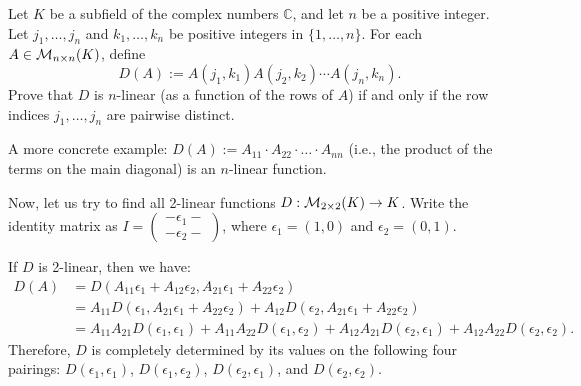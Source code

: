 \begin{exercise}
\label{exc:monomial_matrix_multilinear}
Let $K$ be a subfield of the complex numbers $\mathbb{C}$, and let $n$ be a positive integer. Let $j_1, \dots, j_n$ and $k_1, \dots, k_n$ be positive integers in $\{1, \dots, n\}$. For each $A \in \mathcal{M}_{n \times n}(K)$, define
\[
D(A) := A(j_1, k_1) A(j_2, k_2) \cdots A(j_n, k_n).
\]
Prove that $D$ is $n$-linear (as a function of the rows of $A$) if and only if the row indices $j_1, \dots, j_n$ are pairwise distinct.
\end{exercise}

\begin{example}\label{ex:diagonal_product}
  A more concrete example: $D(A) := A_{11} \cdot A_{22} \cdot \dots \cdot A_{nn}$ (i.e., the product of the terms on the main diagonal) is an $n$-linear function.
\end{example}

Now, let us try to find all 2-linear functions $D: \mathcal{M}_{2 \times 2}(K) \to K$. Write the identity matrix as $I = \left(\begin{smallmatrix} -\epsilon_1- \\ -\epsilon_2- \end{smallmatrix}\right)$, where $\epsilon_1 = (1, 0)$ and $\epsilon_2 = (0, 1)$.

If $D$ is 2-linear, then we have:
\begin{align*}
  D(A) &= D(A_{11}\epsilon_1 + A_{12}\epsilon_2, A_{21}\epsilon_1 + A_{22}\epsilon_2) \\
  &= A_{11} D(\epsilon_1, A_{21}\epsilon_1 + A_{22}\epsilon_2) + A_{12} D(\epsilon_2, A_{21}\epsilon_1 + A_{22}\epsilon_2) \\
  &= A_{11}A_{21}D(\epsilon_1, \epsilon_1) + A_{11}A_{22}D(\epsilon_1, \epsilon_2) + A_{12}A_{21}D(\epsilon_2, \epsilon_1) + A_{12}A_{22}D(\epsilon_2, \epsilon_2).
\end{align*}
Therefore, $D$ is completely determined by its values on the following four pairings: $D(\epsilon_1, \epsilon_1)$, $D(\epsilon_1, \epsilon_2)$, $D(\epsilon_2, \epsilon_1)$, and $D(\epsilon_2, \epsilon_2)$.

